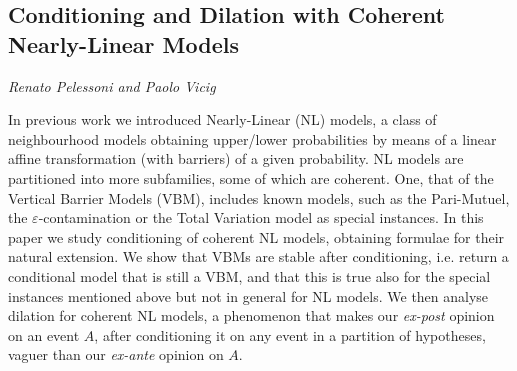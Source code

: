 \documentclass[../booklet.tex]{subfiles}
\begin{document}
\subsection[Conditioning and Dilation with Coherent Nearly-Linear Models. {\it Renato Pelessoni and Paolo Vicig}]{Conditioning and Dilation with Coherent Nearly-Linear Models}
 

\begin{center}
  {\it Renato Pelessoni and Paolo Vicig}
\end{center}

\vskip 0.8cm


In previous work we introduced Nearly-Linear (NL) models, a class of neighbourhood models obtaining upper/lower probabilities by means of a linear affine transformation (with barriers) of a given probability.
NL models are partitioned into more subfamilies, some of which are coherent.
One, that of the Vertical Barrier Models (VBM), includes known models, such as the Pari-Mutuel, the $\varepsilon$-contamination or the Total Variation model as special instances.
In this paper we study conditioning of coherent NL models, obtaining formulae for their natural extension.
We show that VBMs are stable after conditioning, i.e. return a conditional model that is still a VBM, and that this is true also for the special instances mentioned above but not in general for NL models. We then analyse dilation for coherent NL models, a phenomenon that makes our \emph{ex-post} opinion on an event $A$, after conditioning it on any event in a partition of hypotheses, vaguer than our \emph{ex-ante} opinion on $A$.

\end{document}
